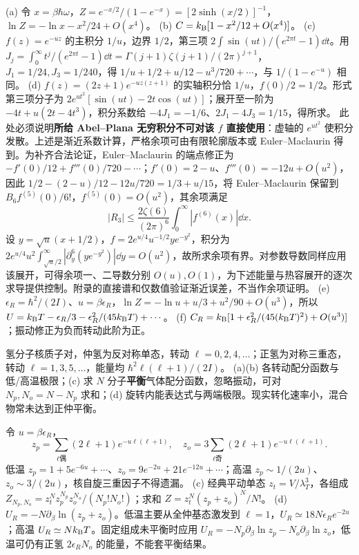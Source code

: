 \begin{solution}
(a) 令 $x=\beta\hbar\omega$，$Z=e^{-x/2}/(1-e^{-x})=[2\sinh(x/2)]^{-1}$，$\ln Z=-\ln x-x^2/24+O(x^4)$。
(b) $C=k_{\mathrm B}[1-x^2/12+O(x^4)]$。
(c) $f(z)=e^{-uz}$ 的主积分 $1/u$，边界 $1/2$，第三项 $2\int\sin(ut)/(e^{2\pi t}-1)\dd t$。用 $J_j=\int_0^\infty t^j/(e^{2\pi t}-1)\dd t=\Gamma(j+1)\zeta(j+1)/(2\pi)^{j+1}$，$J_1=1/24,J_3=1/240$，得 $1/u+1/2+u/12-u^3/720+\cdots$，与 $1/(1-e^{-u})$ 相同。
(d) $f(z)=(2z+1)e^{-uz(z+1)}$ 的实轴积分恰 $1/u$，$f(0)/2=1/2$。形式第三项分子为 $2e^{ut^2}[\sin(ut)-2t\cos(ut)]$；展开至一阶为 $-4t+u(2t-4t^3)$，积分系数给 $-4J_1=-1/6$、$2J_1-4J_3=1/15$，得所求。
此处必须说明\textbf{所给 Abel--Plana 无穷积分不可对该 $f$ 直接使用}：虚轴的 $e^{ut^2}$ 使积分发散。上述是渐近系数计算，严格余项可由有限轮廓版本或 Euler--Maclaurin 得到。为补齐合法论证，Euler--Maclaurin 的端点修正为 $-f'(0)/12+f'''(0)/720-\cdots$；$f'(0)=2-u$、$f'''(0)=-12u+O(u^2)$，因此 $1/2-(2-u)/12-12u/720=1/3+u/15$，将 Euler--Maclaurin 保留到 $B_6f^{(5)}(0)/6!$，$f^{(5)}(0)=O(u^2)$，其余项满足
\[|R_3|\le\frac{2\zeta(6)}{(2\pi)^6}\int_0^\infty|f^{(6)}(x)|\dd x.\]
设 $y=\sqrt u(x+1/2)$，$f=2e^{u/4}u^{-1/2}y e^{-y^2}$，积分为 $2e^{u/4}u^2\int_{\sqrt u/2}^\infty|\partial_y^6(ye^{-y^2})|\dd y=O(u^2)$，故所求余项有界。对参数导数同样应用该展开，可得余项一、二导数分别 $O(u),O(1)$，为下述能量与热容展开的逐次求导提供控制。附录的直接谱和仅数值验证渐近误差，不当作余项证明。
(e) $\epsilon_R=\hbar^2/(2I)$、$u=\beta\epsilon_R$，$\ln Z=-\ln u+u/3+u^2/90+O(u^3)$，所以 $U=k_{\mathrm B} T-\epsilon_R/3-\epsilon_R^2/(45k_{\mathrm B} T)+\cdots$。
(f) $C_R=k_{\mathrm B}[1+\epsilon_R^2/(45(k_{\mathrm B} T)^2)+O(u^3)]$；振动修正为负而转动此阶为正。
\end{solution}
\begin{exercise}
氢分子核质子对，仲氢为反对称单态，转动 $\ell=0,2,4,\ldots$；正氢为对称三重态，转动 $\ell=1,3,5,\ldots$，能量均 $\hbar^2\ell(\ell+1)/(2I)$。
(a)(b) 各转动配分函数与低/高温极限；(c) 求 $N$ 分子\textbf{平衡}气体配分函数，忽略振动，可对 $N_p,N_o=N-N_p$ 求和；(d) 旋转内能表达式与两端极限。现实转化速率小，混合物常未达到正仲平衡。
\end{exercise}
\begin{solution}
令 $u=\beta\epsilon_R$，
\[z_p=\sum_{\ell\text{偶}}(2\ell+1)e^{-u\ell(\ell+1)},\quad
z_o=3\sum_{\ell\text{奇}}(2\ell+1)e^{-u\ell(\ell+1)}.\]
低温 $z_p=1+5e^{-6u}+\cdots$、$z_o=9e^{-2u}+21e^{-12u}+\cdots$；高温 $z_p\sim1/(2u)$、$z_o\sim3/(2u)$，核自旋三重因子不得遗漏。
(c) 经典平动单态 $z_t=V/\lambda_T^3$，各组成 $Z_{N_p,N_o}=z_t^Nz_p^{N_p}z_o^{N_o}/(N_p!N_o!)$；求和 $Z=z_t^N(z_p+z_o)^N/N!$。
(d) $U_R=-N\partial_\beta\ln(z_p+z_o)$。低温主要从全仲基态激发到 $\ell=1$，$U_R\simeq18N\epsilon_Re^{-2u}$；高温 $U_R\simeq Nk_{\mathrm B} T$。固定组成未平衡时应用 $U_R=-N_p\partial_\beta\ln z_p-N_o\partial_\beta\ln z_o$，低温可仍有正氢 $2\epsilon_RN_o$ 的能量，不能套平衡结果。
\end{solution}
